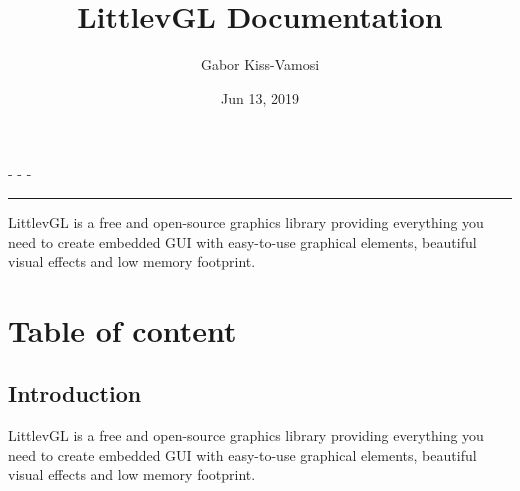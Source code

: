 \documentclass[letterpaper,10pt,english]{sphinxmanual}
\title{LittlevGL Documentation}
\date{Jun 13, 2019}
\author{Gabor Kiss-Vamosi}
\begin{document}
\maketitle
\sphinxtableofcontents
{}\label{\detokenize{index::doc}}
 -
 -
 -


\bigskip\hrule\bigskip





LittlevGL is a free and open-source graphics library providing everything you need to create embedded GUI with easy-to-use graphical elements, beautiful visual effects and low memory footprint.


\chapter{Table of content}
\label{\detokenize{index:table-of-content}}\label{\detokenize{index:welcome-to-littlevgl-s-documentation}}

\section{Introduction}
\label{\detokenize{intro::doc}}\label{\detokenize{intro:introduction}}
LittlevGL is a free and open-source graphics library providing everything you need to create embedded GUI with easy-to-use graphical elements, beautiful visual effects and low memory footprint.
\end{document}
